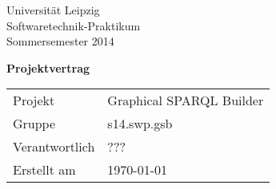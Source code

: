 \def\verantwortlicher{???} %
\thispagestyle{empty} 

\vspace*{2\baselineskip}

\begin{center}
\sffamily
Universität Leipzig\\
Softwaretechnik-Praktikum\\
Sommersemester 2014
\baselineskip

\bgroup
\Huge\textbf{Projektvertrag}
\egroup
{}\baselineskip

\begin{tabular}{ll}
Projekt & Graphical SPARQL Builder \\
Gruppe & s14.swp.gsb \\
Verantwortlich & \verantwortlicher\\
Erstellt am & \today \\
\end{tabular}
\end{center}

\vfill%

\tableofcontents

\pagebreak


